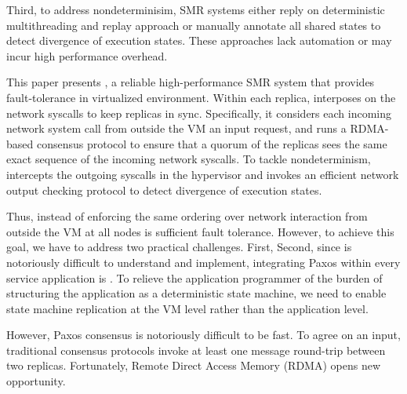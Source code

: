 Third, to address nondeterminisim, SMR systems either reply on deterministic multithreading and replay 
approach or manually annotate all shared states to detect divergence of execution states. These 
approaches lack automation or may incur high performance overhead.

This paper presents \xxx, a reliable high-performance SMR system that provides fault-tolerance 
in virtualized environment. Within each replica, \xxx interposes on the network syscalls to keep 
replicas in sync. Specifically, it considers each incoming network system call from outside the VM 
an input request, and runs a RDMA-based \paxos consensus protocol to ensure that a quorum of the 
replicas sees the same exact sequence of the incoming network syscalls. To tackle nondeterminism, 
\xxx intercepts the outgoing syscalls in the hypervisor and invokes an efficient network output 
checking protocol to detect divergence of execution states.

Thus, instead of 
enforcing the same ordering over network interaction from outside the VM at all nodes is 
sufficient fault tolerance. However, to achieve this goal, we have to address two practical 
challenges. First, Second, since \paxos is notoriously difficult to understand and implement, 
integrating Paxos within every service application is . To relieve the application programmer 
of the burden of structuring the application as a deterministic state machine, we need to 
enable state machine replication at the VM level rather than the application level.


However, Paxos consensus is notoriously difficult to be fast. 
To agree on an input, traditional consensus protocols invoke at least one 
message round-trip between two replicas. Fortunately, Remote Direct Access Memory (RDMA) opens new opportunity.

